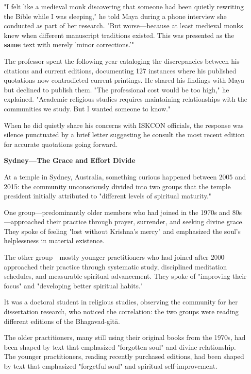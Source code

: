 \documentclass[12pt,twoside]{book}
\begin{document}
"I felt like a medieval monk discovering that someone had been quietly rewriting the Bible while I was sleeping," he told Maya during a phone interview she conducted as part of her research. "But worse—because at least medieval monks knew when different manuscript traditions existed. This was presented as the \textbf{same} text with merely 'minor corrections.'"

The professor spent the following year cataloging the discrepancies between his citations and current editions, documenting 127 instances where his published quotations now contradicted current printings. He shared his findings with Maya but declined to publish them. "The professional cost would be too high," he explained. "Academic religious studies requires maintaining relationships with the communities we study. But I wanted someone to know."

When he did quietly share his concerns with ISKCON officials, the response was silence punctuated by a brief letter suggesting he consult the most recent edition for accurate quotations going forward.

\textbf{\textbf{Sydney—The Grace and Effort Divide}}

At a temple in Sydney, Australia, something curious happened between 2005 and 2015: the community unconsciously divided into two groups that the temple president initially attributed to "different levels of spiritual maturity."

One group—predominantly older members who had joined in the 1970s and 80s—approached their practice through prayer, surrender, and seeking divine grace. They spoke of feeling "lost without Krishna's mercy" and emphasized the soul's helplessness in material existence.

The other group—mostly younger practitioners who had joined after 2000—approached their practice through systematic study, disciplined meditation schedules, and measurable spiritual advancement. They spoke of "improving their focus" and "developing better spiritual habits."

It was a doctoral student in religious studies, observing the community for her dissertation research, who noticed the correlation: the two groups were reading different editions of the Bhagavad-gītā.

The older practitioners, many still using their original books from the 1970s, had been shaped by text that emphasized "forgotten soul" and divine relationship. The younger practitioners, reading recently purchased editions, had been shaped by text that emphasized "forgetful soul" and spiritual self-improvement.
\end{document}
